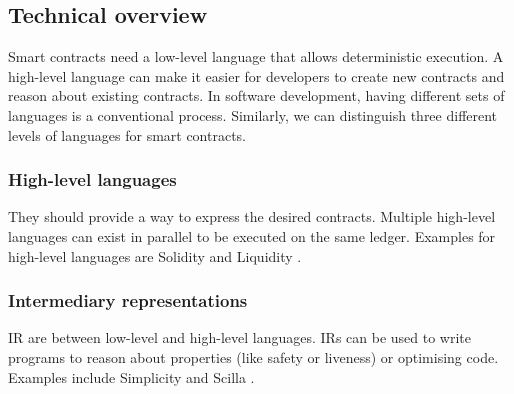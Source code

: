 

\subsection{Technical overview}
Smart contracts need a low-level language that allows deterministic execution. 
A high-level language can make it easier for developers to create new contracts and reason about existing contracts.
In software development, having different sets of languages is a conventional process.
Similarly, we can distinguish three different levels of languages for smart contracts.

\subsubsection{High-level languages} They should provide a way to express the desired contracts. Multiple high-level languages can exist in parallel to be executed on the same ledger. Examples for high-level languages are Solidity \cite{Ethereum2018Solidity} and Liquidity \cite{OCamlProSAS2018}.

\subsubsection{Intermediary representations} IR are between low-level and high-level languages. IRs can be used to write programs to reason about properties (like safety or liveness) or optimising code. Examples include Simplicity \cite{OConnor2017} and Scilla \cite{Sergey2018}.

